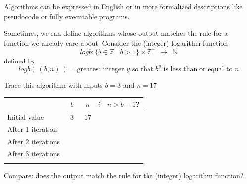 

Algorithms can be expressed in English or in more formalized descriptions like pseudocode or fully executable programs.


Sometimes, we can define algorithms whose output matches the 
rule for a function we already care about. Consider the (integer) logarithm function
\[
logb  : \{b \in \mathbb{Z} \mid b >1 \}  \times \mathbb{Z}^+ ~~\to~~ \mathbb{N}
\]
defined by 
\[
logb (~ (b,n)~) =  \text{greatest integer } y \text{ so that } b^y  \text{ is less than or equal to } n 
\]



Trace this algorithm with inputs $b=3$ and $n=17$

\vfill
  \begin{tabular}{l|c|c|c|c}
  & $b$ & $n$ & $i$  & $n > b-1$?\\
  \hline 
  Initial value & ~$3$~ & $17$ & \phantom{$0$} & \phantom{~Yes~}\\
  After 1 iteration  & \phantom{$3$} & \phantom{$5$} & \phantom{$1$} & \phantom{T}\\
  After 2 iterations & \phantom{$3$} & \phantom{$1$} & \phantom{$2$} & \phantom{F}\\
  After 3 iterations &  &  & & \\
  &&&&\\
  \end{tabular}

\vfill

\vfill

Compare: does the output match the rule for the (integer) logarithm function?


\newpage